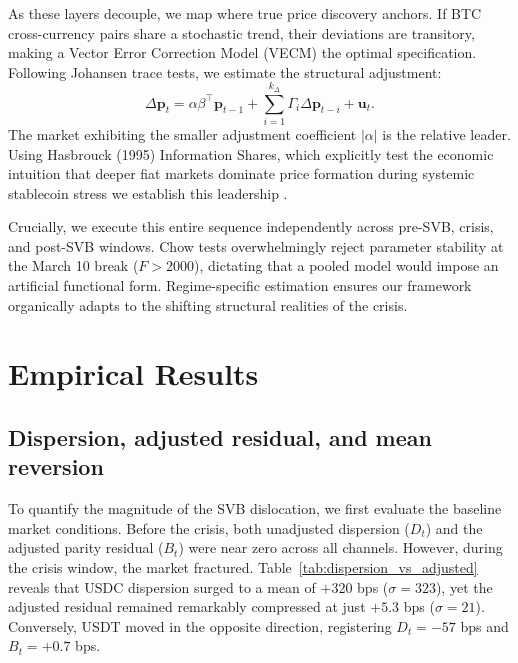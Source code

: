 \documentclass[12pt,twocolumn]{article}
\begin{document}
As these layers decouple, we map where true price discovery anchors. If BTC cross-currency pairs share a stochastic trend, their deviations are transitory, making a Vector Error Correction Model (VECM) the optimal specification. Following Johansen trace tests, we estimate the structural adjustment:
\begin{equation}
    \Delta \mathbf{p}_t = \alpha \beta^\top \mathbf{p}_{t-1} + \sum_{i=1}^{k_{\Delta}} \Gamma_i \Delta \mathbf{p}_{t-i} + \mathbf{u}_t.
\end{equation}
The market exhibiting the smaller adjustment coefficient $|\alpha|$ is the relative leader. Using Hasbrouck (1995) Information Shares, which explicitly test the economic intuition that deeper fiat markets dominate price formation during systemic stablecoin stress we establish this leadership .

Crucially, we execute this entire sequence independently across pre-SVB, crisis, and post-SVB windows. Chow tests overwhelmingly reject parameter stability at the March 10 break ($F > 2000$), dictating that a pooled model would impose an artificial functional form. Regime-specific estimation ensures our framework organically adapts to the shifting structural realities of the crisis.

\section{Empirical Results}\label{sec:results}

\subsection{Dispersion, adjusted residual, and mean reversion}

To quantify the magnitude of the SVB dislocation, we first evaluate the baseline market conditions. Before the crisis, both unadjusted dispersion ($D_t$) and the adjusted parity residual ($B_t$) were near zero across all channels. However, during the crisis window, the market fractured. Table~\ref{tab:dispersion_vs_adjusted} reveals that USDC dispersion surged to a mean of $+320$ bps ($\sigma{=}323$), yet the adjusted residual remained remarkably compressed at just $+5.3$ bps ($\sigma{=}21$). Conversely, USDT moved in the opposite direction, registering $D_t{=}{-}57$ bps and $B_t{=}{+}0.7$ bps. 
\end{document}
